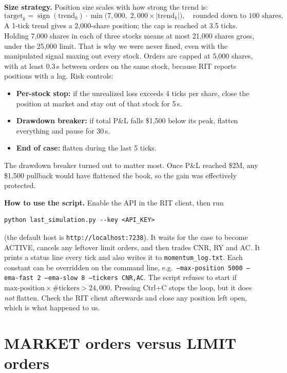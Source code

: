 \documentclass[11pt]{article}
\begin{document}
\textbf{Size strategy.} Position size scales with how strong the trend is:
\[
  \text{target}_k = \operatorname{sign}(\text{trend}_k)\cdot
  \min\!\big(7{,}000,\; 2{,}000 \times |\text{trend}_k|\big),
  \quad \text{rounded down to 100 shares.}
\]
A 1-tick trend gives a 2,000-share position; the cap is reached at 3.5 ticks.
Holding 7,000 shares in each of three stocks means at most 21,000 shares gross,
under the 25,000 limit. That is why we were never fined, even with the manipulated
signal maxing out every stock. Orders are capped at 5,000 shares, with at least
0.3\,s between orders on the same stock, because RIT reports positions with a lag.
Risk controls:
\begin{itemize}[leftmargin=1.4em, itemsep=0.2em]
  \item \textbf{Per-stock stop:} if the unrealized loss exceeds 4 ticks per share,
        close the position at market and stay out of that stock for 5\,s.
  \item \textbf{Drawdown breaker:} if total P\&L falls \$1,500 below its peak,
        flatten everything and pause for 30\,s.
  \item \textbf{End of case:} flatten during the last 5 ticks.
\end{itemize}
The drawdown breaker turned out to matter most. Once P\&L reached \$2M, any
\$1,500 pullback would have flattened the book, so the gain was effectively
protected.

\textbf{How to use the script.} Enable the API in the RIT client, then run
\begin{verbatim}
python last_simulation.py --key <API_KEY>
\end{verbatim}
(the default host is \texttt{http://localhost:7238}). It waits for the case to
become ACTIVE, cancels any leftover limit orders, and then trades CNR, RY and AC.
It prints a status line every tick and also writes it to
\texttt{momentum\_log.txt}. Each constant can be overridden on the command line,
e.g.\ \texttt{--max-position 5000 --ema-fast 2 --ema-slow 8 --tickers CNR,AC}. The
script refuses to start if $\text{max-position}\times\#\text{tickers} > 24{,}000$.
Pressing Ctrl+C stops the loop, but it does \emph{not} flatten. Check the RIT
client afterwards and close any position left open, which is what happened to us.

\section{MARKET orders versus LIMIT orders}
\end{document}
